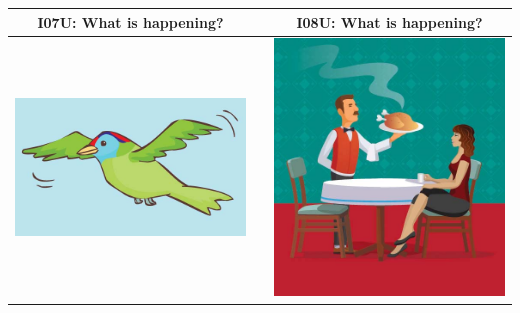 \documentclass[12pt,notitlepage]{article}
\begin{document}
\begin{center}
\begin{tabular}{|c|c|c|}
\hline
I07U: What is happening? && I08U: What is happening? \\
\hline
\includegraphics[width=20em,trim=0 0 0 -3]{figures/I07.jpg} & & \includegraphics[width=20em,trim=0 0 0 -3]{figures/I08.jpg} \\
\hline
\end{tabular}
\vspace{1em} \\



\end{center}
\end{document}
